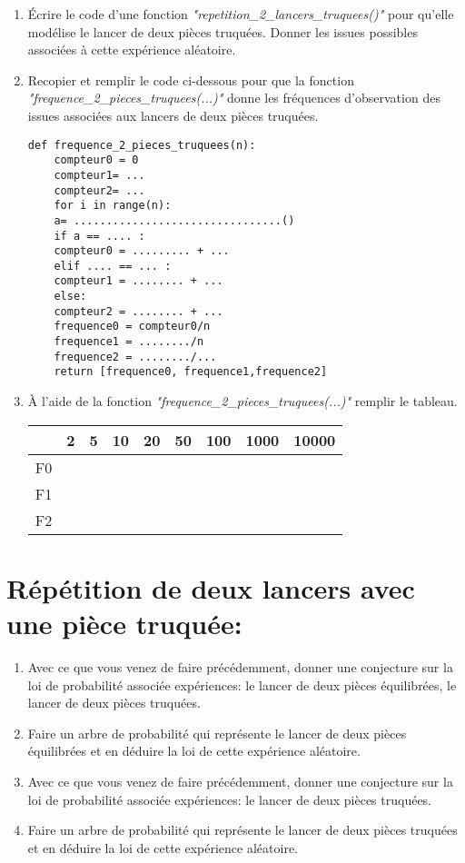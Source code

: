 \documentclass[11pt,a4paper]{book}
\begin{document}
\begin{enumerate}
	\item Écrire le code d'une fonction \emph{"repetition\_2\_lancers\_truquees()"} pour qu'elle  modélise le lancer de deux pièces truquées. Donner les issues possibles associées à cette expérience aléatoire. 
	\item Recopier et remplir le code ci-dessous pour que la fonction \emph{"frequence\_2\_pieces\_truquees(...)"} donne les fréquences d'observation des issues associées aux lancers de deux pièces truquées.
	\begin{lstlisting}[style=stylepython]
	def frequence_2_pieces_truquees(n): 
	compteur0 = 0
	compteur1= ...
	compteur2= ...
	for i in range(n):
	a= ................................()
	if a == .... :
	compteur0 = ......... + ...
	elif .... == ... :
	compteur1 = ........ + ...
	else:
	compteur2 = ........ + ...
	frequence0 = compteur0/n
	frequence1 = ......../n
	frequence2 = ......../...
	return [frequence0, frequence1,frequence2]			
	\end{lstlisting}
	\item À l'aide de la fonction \emph{"frequence\_2\_pieces\_truquees(...)"} remplir le tableau.
	\begin{table}[htbp]
		\centering
		\begin{tabularx}{\textwidth}{| X | X | X | X | X | X | X | X | X |}
			\hline
			& 
			2 & 5 & 10 & 20 & 50 & 100 &1000&10000  \\ 
			\hline
			F0   &  &  &  &  & & & & \\[0.2cm]  \hline
			F1   &  &  &  &  & & & & \\[0.2cm] \hline
			F2 &   & & & & & & & \\[0.2cm] \hline
		\end{tabularx}
	\end{table}
\end{enumerate}	
\section{Répétition de deux lancers avec une pièce truquée:}

\begin{enumerate}
	\item Avec ce que vous venez de faire précédemment, donner une conjecture sur la loi de probabilité associée expériences: le lancer de deux pièces équilibrées, le lancer de deux pièces truquées.
	\item Faire un arbre de probabilité qui représente le lancer de deux pièces équilibrées et en déduire la loi de cette expérience aléatoire.
	\item Avec ce que vous venez de faire précédemment, donner une conjecture sur la loi de probabilité associée expériences: le lancer de deux pièces truquées.
	\item Faire un arbre de probabilité qui représente le lancer de deux pièces truquées et en déduire la loi de cette expérience aléatoire. 
\end{enumerate}	
\end{document}
